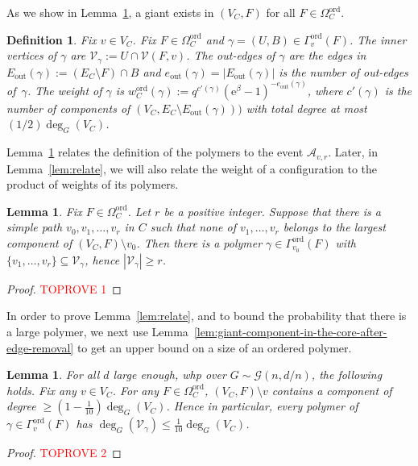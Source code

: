 \documentclass[11pt]{article}
\theoremstyle{plain}
\newtheorem{lemma}[theorem]{Lemma}
\newtheorem{definition}[theorem]{Definition}
\newcommand{\G}{\mathcal{G}}
\newcommand{\A}{\mathcal{A}}
\newcommand{\emm}{\mathrm{e}}
\newcommand{\V}{\mathcal{V}}
\newcommand{\Vin}{\V_\gamma}
\newcommand{\out}{\mathrm{out}}
\newcommand{\1}{\mathbb{1}}
\newcommand{\ord}{\mathrm{ord}}
\begin{document}
As we show in Lemma~\ref{lem:ordered-polymers-are-small}, a giant exists in \((V_C,F)\) for all \(F\in\Omega_C^\ord\).
 
\begin{definition}\label{def:45f43w}
    Fix \(v\in V_C\).  Fix \(F\in\Omega^\ord_C\) and \(\gamma = (U, B)\in\Gamma^\ord_v(F)\).
The \emph{inner vertices} of \(\gamma\) are \(\Vin := U\cap \V(F,v)\). The \emph{out-edges} of \(\gamma\) are the edges in \(E_\out(\gamma) := (E_C\setminus F)\cap B\) and \(e_\out(\gamma) = |E_\out(\gamma)|\) is the number of out-edges of~$\gamma$.
    The weight of \(\gamma\) is \(w^\ord_C(\gamma) := q^{c'(\gamma)} (\emm^\beta - 1)^{-e_\out(\gamma)}\), where \(c'(\gamma)\) is the number of  components of \((V_C, E_C\setminus E_\out(\gamma)))\) with total degree at most $(1/2) \deg_G(V_C)$.
\end{definition}



Lemma~\ref{lem:path-large-polymer}
relates the definition of the polymers to the event \(\A_{v,r}\).
Later, in Lemma~\ref{lem:relate}, we will also relate
the weight of a configuration to the product of weights of its polymers.

\begin{lemma}\label{lem:path-large-polymer}
Fix \(F\in\Omega^\ord_C\).
Let $r$ be a positive integer.  Suppose that there is a simple path \(v_0,v_1,\dots,v_r\) in \(C\) such that \emph{none} of \(v_1,\dots, v_r\) belongs to the largest component of \((V_C,F)\setminus v_0\). Then there is a polymer \(\gamma\in\Gamma_{v_0}^\ord(F)\) with 
\(\{v_1,\dots,v_r\}\subseteq\Vin\),
hence $|\Vin| \geq r$.
\end{lemma}
\begin{proof}\textcolor{red}{TOPROVE 1}\end{proof}



In order to prove Lemma~\ref{lem:relate}, and to
bound the probability that there is a large polymer, we next  use Lemma~\ref{lem:giant-component-in-the-core-after-edge-removal} to get an upper bound on a size of an ordered polymer.  

\begin{lemma}\label{lem:ordered-polymers-are-small}
    For all \(d\) large enough, whp over \(G\sim \G(n,d/n)\), the following holds. Fix any \(v\in V_C\). For any \(F\in\Omega^\ord_C\), \((V_C,F)\setminus v\) contains a component of degree \(\geq (1-\tfrac{1}{10})\deg_G(V_C)\).
    Hence in particular, every polymer of \(\gamma\in\Gamma^\ord_v(F)\) has \(\deg_G(\Vin) \leq \tfrac{1}{10}\deg_G(V_C)\).
\end{lemma}
\begin{proof}\textcolor{red}{TOPROVE 2}\end{proof}
\end{document}
